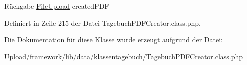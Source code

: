\begin{DoxyReturn}{Rückgabe}
\mbox{\hyperlink{class_file_upload}{File\+Upload}} created\+P\+DF 
\end{DoxyReturn}


Definiert in Zeile 215 der Datei Tagebuch\+P\+D\+F\+Creator.\+class.\+php.



Die Dokumentation für diese Klasse wurde erzeugt aufgrund der Datei\+:\begin{DoxyCompactItemize}
\item 
Upload/framework/lib/data/klassentagebuch/Tagebuch\+P\+D\+F\+Creator.\+class.\+php\end{DoxyCompactItemize}

